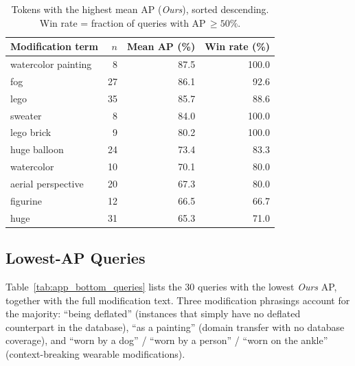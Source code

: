 \begin{table}[htbp]
\centering
\caption{Tokens with the highest mean AP (\emph{Ours}), sorted
descending. Win rate = fraction of queries with AP\,$\ge\!50\%$.}
\label{tab:app_best_tokens}
\small
\begin{tabular}{l r r r}
\toprule
Modification term & $n$ & Mean AP (\%) & Win rate (\%) \\
\midrule
watercolor painting &  8 & 87.5 & 100.0 \\
fog                 & 27 & 86.1 &  92.6 \\
lego                & 35 & 85.7 &  88.6 \\
sweater             &  8 & 84.0 & 100.0 \\
lego brick          &  9 & 80.2 & 100.0 \\
huge balloon        & 24 & 73.4 &  83.3 \\
watercolor          & 10 & 70.1 &  80.0 \\
aerial perspective  & 20 & 67.3 &  80.0 \\
figurine            & 12 & 66.5 &  66.7 \\
huge                & 31 & 65.3 &  71.0 \\
\bottomrule
\end{tabular}
\end{table}

\subsection*{Lowest-AP Queries}

Table~\ref{tab:app_bottom_queries} lists the 30 queries with the lowest
\emph{Ours} AP, together with the full modification text.  Three
modification phrasings account for the majority: ``being deflated''
(instances that simply have no deflated counterpart in the database),
``as a painting'' (domain transfer with no database coverage), and
``worn by a dog'' / ``worn by a person'' / ``worn on the ankle''
(context-breaking wearable modifications).

